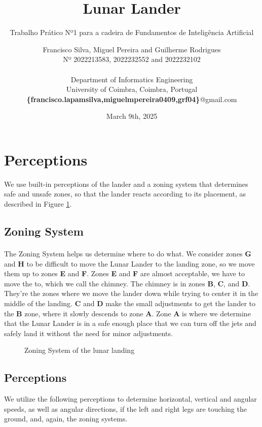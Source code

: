 \documentclass{article}
\title{\textbf{Lunar Lander}}
\subtitle{Trabalho Prático Nº1 para a cadeira de Fundamentos de Inteligência Artificial}
\author{Francisco Silva, Miguel Pereira and Guilherme Rodrigues 
\\ Nº 2022213583, 2022232552 and 2022232102 \\ \\
Department of Informatics Engineering \\
University of Coimbra, Coimbra, Portugal
\\ \textbf{\{francisco.lapamsilva,miguelmpereira0409,grf04\}}@gmail.com}
\date{March 9th, 2025}
\begin{document}
\maketitle

\section{Perceptions}
We use built-in perceptions of the lander and a zoning system that determines safe and unsafe zones, so that the lander reacts according to its placement, as described in Figure \ref{fig:zoningsystem}.
\subsection{Zoning System}
\paragraph{}The Zoning System helps us determine where to do what. We consider zones \textbf{G} and \textbf{H} to be difficult to move the Lunar Lander to the landing zone, so we move them up to zones \textbf{E} and \textbf{F}. Zones \textbf{E} and \textbf{F} are almost acceptable, we have to move the to, which we call the chimney.  The chimney is in zones \textbf{B}, \textbf{C}, and \textbf{D}. They're the zones where we move the lander down while trying to center it in the middle of the landing. \textbf{C} and \textbf{D} make the small adjustments to get the lander to the \textbf{B} zone, where it slowly descends to zone \textbf{A}.  Zone \textbf{A} is where we determine that the Lunar Lander is in a safe enough place that we can turn off the jets and safely land it without the need for minor adjustments.

\begin{figure}[htbp]
\centering

\caption{\label{fig:zoningsystem}Zoning System of the lunar landing}
\end{figure}

\subsection{Perceptions}
We utilize the following perceptions to determine horizontal, vertical and angular speeds, as well as angular directions, if the left and right legs are touching the ground, and, again, the zoning systems.
\end{document}
